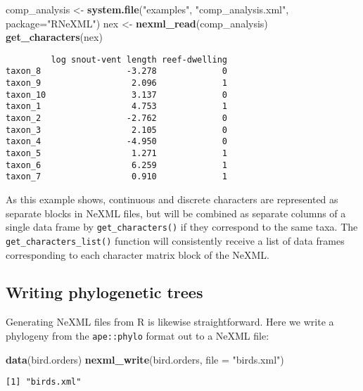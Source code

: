 \documentclass[author-year, review, 11pt]{components/elsarticle} %
\newenvironment{Shaded}{\begin{snugshade}}{\end{snugshade}}
\newcommand{\KeywordTok}[1]{\textcolor[rgb]{0.13,0.29,0.53}{\textbf{{#1}}}}
\newcommand{\DataTypeTok}[1]{\textcolor[rgb]{0.13,0.29,0.53}{{#1}}}
\newcommand{\StringTok}[1]{\textcolor[rgb]{0.31,0.60,0.02}{{#1}}}
\newcommand{\NormalTok}[1]{{#1}}
\begin{document}
\begin{Shaded}
\begin{Highlighting}[]
\NormalTok{comp_analysis <-}\StringTok{ }\KeywordTok{system.file}\NormalTok{(}\StringTok{"examples"}\NormalTok{, }\StringTok{"comp_analysis.xml"}\NormalTok{, }\DataTypeTok{package=}\StringTok{"RNeXML"}\NormalTok{)}
\NormalTok{nex <-}\StringTok{ }\KeywordTok{nexml_read}\NormalTok{(comp_analysis)}
\KeywordTok{get_characters}\NormalTok{(nex)}
\end{Highlighting}
\end{Shaded}

\begin{verbatim}
         log snout-vent length reef-dwelling
taxon_8                 -3.278             0
taxon_9                  2.096             1
taxon_10                 3.137             0
taxon_1                  4.753             1
taxon_2                 -2.762             0
taxon_3                  2.105             0
taxon_4                 -4.950             0
taxon_5                  1.271             1
taxon_6                  6.259             1
taxon_7                  0.910             1
\end{verbatim}

As this example shows, continuous and discrete characters are
represented as separate blocks in NeXML files, but will be combined as
separate columns of a single data frame by \texttt{get\_characters()} if
they correspond to the same taxa. The \texttt{get\_characters\_list()}
function will consistently receive a list of data frames corresponding
to each character matrix block of the NeXML.

\subsection{Writing phylogenetic
trees}\label{writing-phylogenetic-trees}

Generating NeXML files from R is likewise straightforward. Here we write
a phylogeny from the \texttt{ape::phylo} format out to a NeXML file:

\begin{Shaded}
\begin{Highlighting}[]
\KeywordTok{data}\NormalTok{(bird.orders)}
\KeywordTok{nexml_write}\NormalTok{(bird.orders, }\DataTypeTok{file =} \StringTok{"birds.xml"}\NormalTok{)}
\end{Highlighting}
\end{Shaded}

\begin{verbatim}
[1] "birds.xml"
\end{verbatim}
\end{document}
